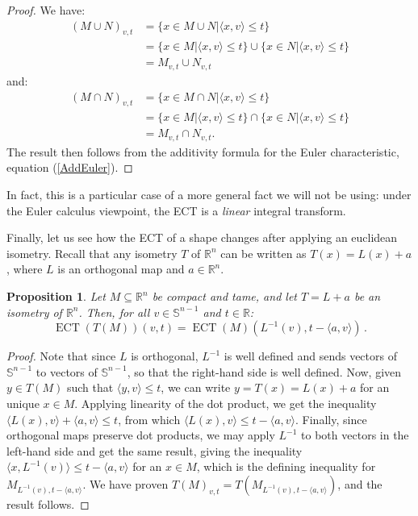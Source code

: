 \documentclass[a4paper]{article}
\newtheorem{prop}[theorem]{Proposition}
\newcommand{\ECT}{\operatorname{ECT}}
\newcommand{\bb}{\mathbb}
\begin{document}
\begin{proof}
	We have:
	\begin{align*}
		(M\cup N)_{v,t}&=\{x \in M\cup N | \langle x, v\rangle\leq t\} \\
		&=\{ x \in M | \langle x, v\rangle\leq t\} \cup \{ x \in N | \langle x, v\rangle\leq t\} \\
		&=M_{v,t} \cup N_{v,t}
	\end{align*}
	and:
	\begin{align*}
		(M\cap N)_{v,t}&=\{x \in M\cap N | \langle x, v\rangle\leq t\} \\
		&=\{ x \in M | \langle x, v\rangle\leq t\} \cap \{ x \in N | \langle x, v\rangle\leq t\} \\
		&=M_{v,t} \cap N_{v,t}.
	\end{align*}
	The result then follows from the additivity formula for the Euler characteristic, equation (\ref{AddEuler}).
\end{proof}

In fact, this is a particular case of a more general fact we will not be using: under the Euler calculus viewpoint, the ECT is a \emph{linear} integral transform.

Finally, let us see how the ECT of a shape changes after applying an euclidean isometry. Recall that any isometry $T$ of $\bb R^n$ can be written as $T(x)=L(x)+a$, where $L$ is an orthogonal map and $a \in \bb R^n$.
\begin{prop}
	\label{isoformula}
	Let $M\subseteq \bb R^n$ be compact and tame, and let $T=L+a$ be an isometry of $\mathbb R^n$. Then, for all $v \in \bb S^{n-1}$ and $t \in \bb R$:
	\[ \ECT(T(M))(v,t)=\ECT(M)(L^{-1}(v), t-\langle a,v \rangle)\, . \]
\end{prop}

\begin{proof}
	Note that since $L$ is orthogonal, $L^{-1}$ is well defined and sends vectors of $ \bb S^{n-1}$ to vectors of $\bb S^{n-1}$, so that the right-hand side is well defined. Now, given $y\in T(M)$ such that $\langle y,v \rangle\leq t$, we can write $y=T(x)=L(x)+a$ for an unique $x \in M$. Applying linearity of the dot product, we get the inequality $\langle L(x) , v\rangle +\langle a,v \rangle\leq t$, from which $\langle L(x), v\rangle \leq t-\langle a,v \rangle$. Finally, since orthogonal maps preserve dot products, we may apply $L^{-1}$ to both vectors in the left-hand side and get the same result, giving the inequality $\langle x, L^{-1}(v) \rangle \leq t-\langle a,v \rangle$ for an $x \in M$, which is the defining inequality for $M_{L^{-1}(v), t-\langle a,v \rangle}$. We have proven $T(M)_{v,t}=T(M_{L^{-1}(v), t-\langle a,v \rangle})$, and the result follows.
\end{proof}
\end{document}
